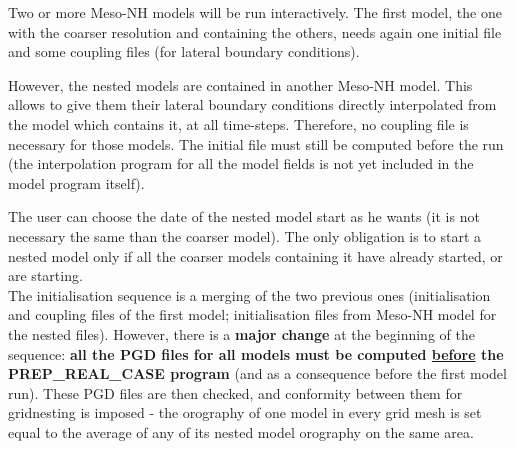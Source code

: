 Two or more Meso-NH models will be run interactively. The first model, the
one with the coarser resolution and containing the others, needs again
one initial file and some coupling files (for lateral boundary conditions).

However, the nested models are contained in another Meso-NH model. This
allows to give them their lateral boundary conditions directly interpolated
from the model which contains it, at all time-steps. Therefore, no coupling file
is necessary for those models. The initial file must still be computed
before the run (the interpolation program for all the model fields is not yet
included in the model program itself).

The user can choose the date of the nested model start as he wants
(it is not necessary the same than the coarser model). The only obligation
is to start a nested model only if all the coarser models containing it
have already started, or are starting.\\

The initialisation sequence is a merging of the two previous ones
(initialisation and coupling files of the first model; initialisation
files from Meso-NH model for the nested files).  However, there is a {\bf
major change} at the beginning of the sequence: {\bf all the PGD files for
all models must be computed \underline{before} the PREP\_REAL\_CASE
program} (and as a consequence before the first model run). These PGD files
are then checked, and conformity between them for gridnesting is imposed
- the orography of one model in every grid mesh is set equal to
the average of any of its nested model orography on the same area.

